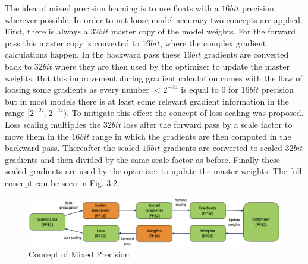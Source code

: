 The idea of mixed precision learning is to use floats with a $16bit$ precision wherever possible. In order to not loose model accuracy two concepts are applied. First, there is always a $32bit$ master copy of the model weights. For the forward pass this master copy is converted to $16bit$, where the complex gradient calculations happen. In the backward pass these $16bit$ gradients are converted back to $32bit$ where they are then used by the optimizer to update the master weights. But this improvement during gradient calculation comes with the flaw of loosing some gradients as every number $<2^{-24}$ is equal to $0$ for $16bit$ precision but in most models there is at least some relevant gradient information in the range $[2^{-27},2^{-24})$. To mitigate this effect the concept of loss scaling was proposed. Loss scaling multiplies the $32bit$ loss after the forward pass by a scale factor to move them in the $16bit$ range in which the gradients are then computed in the backward pass. Thereafter the scaled $16bit$ gradients are converted to scaled $32bit$ gradients and then divided by the same scale factor as before. Finally these scaled gradients are used by the optimizer to update the master weights. The full concept can be seen in \hyperref[fig:3.2]{Fig. 3.2}.
%
\begin{figure}[] \label{fig:3.2}
    \centering
    \includegraphics[width=.9\textwidth]{Chapters/figures/mixed_prec.PNG}
    \caption{Concept of Mixed Precision}
\end{figure}
%

